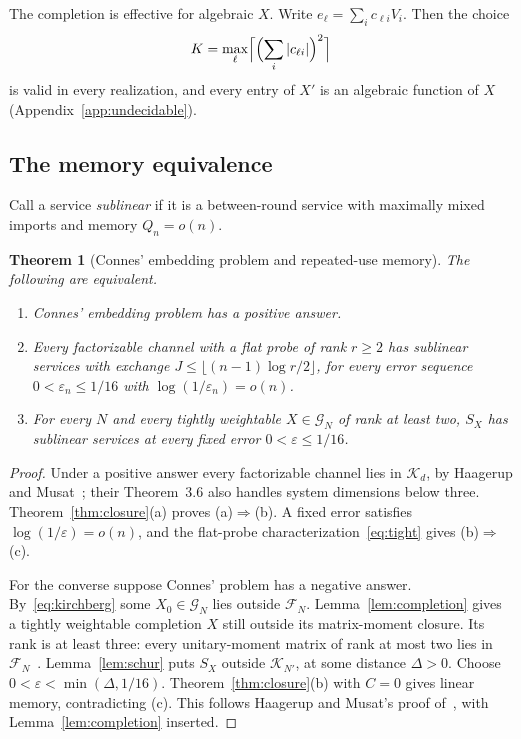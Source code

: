 \documentclass[11pt]{article}
\newtheorem{theorem}{Theorem}
\theoremstyle{definition}
\theoremstyle{remark}
\newcommand{\K}{\mathcal K}
\newcommand{\G}{\mathcal G}
\newcommand{\Fm}{\mathcal F}
\newcommand{\eps}{\varepsilon}
\begin{document}
The completion is effective for algebraic $X$. Write $e_\ell=\sum_ic_{\ell i}V_i$. Then the choice
\[
 K=\max_\ell\Bigl\lceil\Bigl(\sum_i|c_{\ell i}|\Bigr)^2\Bigr\rceil
\]
is valid in every realization, and every entry of $X'$ is an algebraic function of $X$ (Appendix~\ref{app:undecidable}).

\subsection{The memory equivalence}

Call a service \emph{sublinear} if it is a between-round service with maximally mixed imports and memory $Q_n=o(n)$.

\begin{theorem}[Connes' embedding problem and repeated-use memory]\label{thm:connes}
The following are equivalent.
\begin{enumerate}[label=(\alph*),itemsep=3pt]
\item Connes' embedding problem has a positive answer.
\item Every factorizable channel with a flat probe of rank $r\ge2$ has sublinear services with exchange $J\le\lfloor(n-1)\log r/2\rfloor$, for every error sequence $0<\eps_n\le1/16$ with $\log(1/\eps_n)=o(n)$.
\item For every $N$ and every tightly weightable $X\in\G_N$ of rank at least two, $S_X$ has sublinear services at every fixed error $0<\eps\le1/16$.
\end{enumerate}
\end{theorem}

\begin{proof}
Under a positive answer every factorizable channel lies in $\K_d$, by Haagerup and Musat~\cite[Theorems~3.6 and~3.7]{HM2015}; their Theorem~3.6 also handles system dimensions below three. Theorem~\ref{thm:closure}(a) proves (a)$\Rightarrow$(b). A fixed error satisfies $\log(1/\eps)=o(n)$, and the flat-probe characterization~\eqref{eq:tight} gives (b)$\Rightarrow$(c).

For the converse suppose Connes' problem has a negative answer. By~\eqref{eq:kirchberg} some $X_0\in\G_N$ lies outside $\Fm_N$. Lemma~\ref{lem:completion} gives a tightly weightable completion $X$ still outside its matrix-moment closure. Its rank is at least three: every unitary-moment matrix of rank at most two lies in $\Fm_N$~\cite[Proposition~2.10]{DJ}. Lemma~\ref{lem:schur} puts $S_X$ outside $\K_{N'}$, at some distance $\Delta>0$. Choose $0<\eps<\min(\Delta,1/16)$. Theorem~\ref{thm:closure}(b) with $C=0$ gives linear memory, contradicting (c). This follows Haagerup and Musat's proof of~\cite[Theorem~3.7]{HM2015}, with Lemma~\ref{lem:completion} inserted.
\end{proof}
\end{document}
